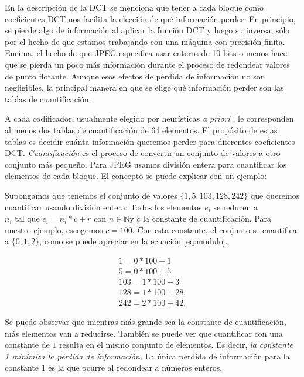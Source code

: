 En la descripción de la DCT se menciona que tener a cada bloque como
coeficientes DCT nos facilita la elección de qué información perder. En
principio, se pierde algo de información al aplicar la función DCT y luego su
inversa, sólo por el hecho de que estamos trabajando con una máquina con
precisión finita. Encima, el hecho de que JPEG especifica usar enteros de 10
bits o menos hace que se pierda un poco más información durante el proceso de
redondear valores de punto flotante. Aunque esos efectos de pérdida de
información no son negligibles, la principal manera en que se elige qué
información perder son las \gls{tablas de cuantificación}.

A cada codificador, usualmente elegido por heurísticas \emph{ a priori }, le
corresponden al menos dos tablas de cuantificación de 64 elementos. El propósito
de estas tablas es decidir cuánta información queremos perder para diferentes
coeficientes DCT. \emph{Cuantificación} es el proceso de convertir un conjunto
de valores a otro conjunto más pequeño. Para JPEG usamos división entera para
cuantificar los elementos de cada bloque. El concepto se puede explicar con un
ejemplo:

Supongamos que tenemos el conjunto de valores $ \{ 1, 5, 103, 128, 242 \} $ que
queremos cuantificar usando división entera: Todos los elementos $e_i$ se
reducen a $ n_i \text{ tal que } e_i = n_i * c + r \text{ con } n \in ℕ \text{
y } c \text{ la constante de cuantificación}$. Para nuestro ejemplo, escogemos
$ c = 100 $. Con esta constante, el conjunto se cuantifica a $ \{ 0, 1, 2\}$,
como se puede apreciar en la ecuación \ref{eq:modulo}.

\begin{align}
    1 = 0 * 100 + 1 \nonumber \\
    5 = 0 * 100 + 5 \nonumber \\
    103 = 1 * 100 + 3 \nonumber \\
    128 = 1 * 100 + 28. \nonumber \\
    242 = 2 * 100 + 42. \label{eq:modulo}
\end{align}

Se puede observar que mientras más grande sea la constante de cuantificación,
más elementos van a reducirse. También se puede ver que cuantificar con una
constante de $1$ resulta en el mismo conjunto de elementos. Es decir, \emph{ la
constante 1 minimiza la pérdida de información.} La única pérdida de
información para la constante 1 es la que ocurre al redondear a números
enteros.

